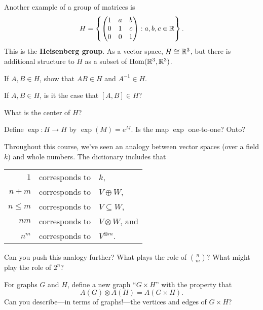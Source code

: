 \documentclass{homework}
\begin{document}
\begin{problem}
  Another example of a group of matrices is
  \[
    H = \left\{ \begin{pmatrix} 1 & a & b \\ 0 & 1 & c \\ 0 & 0 & 1 \end{pmatrix} : a, b, c \in \mathbb{R} \right\}.
  \]
  This is the \textbf{Heisenberg group}.  As a vector space, $H \cong \mathbb{R}^3$, but there is additional structure to $H$ as a subset of $\operatorname{Hom}(\mathbb{R}^3,\mathbb{R}^3)$.

  If $A, B \in H$, show that $AB \in H$ and $A^{-1} \in H$.
  
  If $A, B \in H$, is it the case that $[A,B] \in H$?
\end{problem}

\begin{problem}
  What is the center of $H$?
\end{problem}

\begin{problem}
  Define $\exp : H \to H$ by $\exp(M) = e^M$.
  Is the map $\exp$ one-to-one?  Onto?
\end{problem}

\begin{problem}
  Throughout this course, we've seen an analogy between vector spaces
  (over a field $k$) and whole numbers.  The dictionary includes that
  \begin{center}\begin{tabular}{r@{ }l@{ }l}
    $1$  & corresponds to  & $k$, \\
    $n + m$ & corresponds to  & $V \oplus W$, \\
    $n \leq m$ & corresponds to  & $V \subseteq W$, \\
    $nm$ & corresponds to  & $V \otimes W$, and \\
    $n^m$ & corresponds to  & $V^{\otimes m}$.%
  \end{tabular}\end{center}
Can you push this analogy further?  What plays the role of
$\binom{n}{m}$?  What might play the role of $2^n$?
\end{problem}

\begin{problem}\label{tensor-of-graphs}For graphs $G$ and $H$, define a new graph ``$G \times H$'' with the property that
  \[
    A(G) \otimes A(H) = A(G \times H).
  \]
  Can you describe---in terms of graphs!---the vertices and edges of $G \times H$?
\end{problem}
\end{document}
